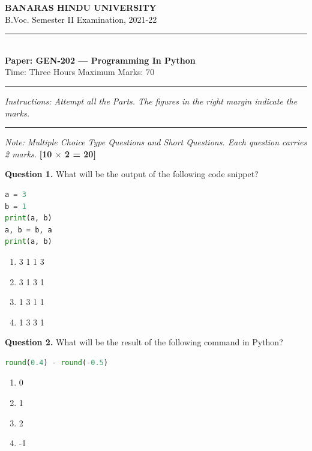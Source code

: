 \documentclass[11pt,a4paper]{article}
\begin{document}
\begin{center}
  {\large\bfseries BANARAS HINDU UNIVERSITY}\\[2pt]
  {\normalsize B.Voc. Semester II Examination, 2021-22}\\[6pt]
  \rule{0.8\linewidth}{0.5pt}\\[6pt]
  {\large\bfseries Paper: GEN-202 --- Programming In Python}\\[4pt]
  {\normalsize Time: Three Hours \hfill Maximum Marks: 70}
\end{center}

\rule{\linewidth}{0.4pt}

\smallskip



\noindent   \textit{Instructions: Attempt all the Parts. The figures in the right margin indicate the marks.}

\bigskip

\bigskip


\rule{\linewidth}{0.4pt}\smallskip




\noindent   \textit{Note: Multiple Choice Type Questions and Short Questions. Each question carries 2 marks.} \hfill   \textbf{[10 $ \times$ 2 = 20]}

\medskip


\noindent   \textbf{Question 1.} What will be the output of the following code snippet?

\begin{lstlisting}[language=Python]
a = 3
b = 1
print(a, b)
a, b = b, a
print(a, b)
\end{lstlisting}

\begin{enumerate}[label=(\alph*),itemsep=2pt]
  \item 3 1 1 3
  \item 3 1 3 1
  \item 1 3 1 1
  \item 1 3 3 1
\end{enumerate}

\medskip


\noindent   \textbf{Question 2.} What will be the result of the following command in Python?

\begin{lstlisting}[language=Python]
round(0.4) - round(-0.5)
\end{lstlisting}

\begin{enumerate}[label=(\alph*),itemsep=2pt]
  \item 0
  \item 1
  \item 2
  \item -1
\end{enumerate}
\end{document}
